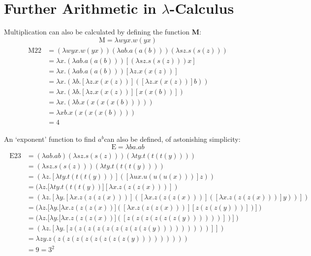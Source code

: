 \documentclass[Master.tex]{subfiles}
\begin{document}
\appendix
\appendixpage
\section{Further Arithmetic in $\lambda$-Calculus}
Multiplication can also be calculated by defining the function \textbf{M}:
\cite{rojas2015lambdatutorial}
\begin{equation*}
\bm{\mathrm{M}} = \lambda wyx.w(yx)
\end{equation*}  
\begin{gather*}
\begin{aligned}
\bm{\mathrm{M22}} &= (\lambda wyx.w(yx))(\lambda ab.a(a(b)))(\lambda sz.s(s(z)))\\
&= \lambda x.(\lambda ab.a(a(b)))[(\lambda sz.s(s(z)))x]\\
&= \lambda x.(\lambda ab.a(a(b)))[\lambda z.x(x(z))]\\
&= \lambda x.(\lambda b.[\lambda z.x(x(z))]([\lambda z.x(x(z))]b))\\
&= \lambda x.(\lambda b.[\lambda z.x(x(z))][x(x(b))])\\
&= \lambda x.(\lambda b.x(x(x(x(b)))))\\
&= \lambda xb.x(x(x(x(b))))\\
&= \bm{\mathrm{4}}
\end{aligned}
\end{gather*}

An `exponent' function to find $a^b$can also be defined, of astonishing simplicity:
\cite{barendregt1984introduction}
\begin{equation*}
\bm{\mathrm{E}} = \lambda ba.ab
\end{equation*}
\begin{gather*}
\begin{aligned}
\bm{\mathrm{E23}} &= (\lambda ab.ab)(\lambda sz.s(s(z)))(\lambda ty.t(t(t(y))))\\
&= (\lambda sz.s(s(z)))(\lambda ty.t(t(t(y))))\\
&= (\lambda z.[\lambda ty.t(t(t(y)))]([\lambda ux.u(u(u(x)))]z))\\
&= (\lambda z.[\lambda ty.t(t(t(y))][\lambda x.z(z(z(x)))])\\
&= (\lambda z.[\lambda y.[\lambda x.z(z(z(x)))]([\lambda x.z(z(z(x)))]([\lambda x.z(z(z(x)))]y))])\\
&= (\lambda z.[\lambda y.[\lambda x.z(z(z(x))]([\lambda x.z(z(z(x)))][z(z(z(y)))])])\\
&= (\lambda z.[\lambda y.[\lambda x.z(z(z(x))]([z(z(z(z(z(z(y))))))])])\\
&= (\lambda z.[\lambda y.[z(z(z(z(z(z(z(z(z(y)))))))))]])\\
&= \lambda zy.z(z(z(z(z(z(z(z(z(y)))))))))\\
&= \bm{\mathrm{9}} = \bm{\mathrm{3^2}}
\end{aligned}
\end{gather*}
\end{document}
